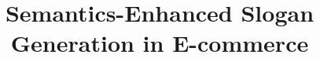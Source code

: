 \documentclass[sigconf]{acmart}
\theoremstyle{definition}
\begin{document}
\title{Semantics-Enhanced Slogan Generation in E-commerce}

%
%
%
%
%
%
%

\author{
}

\renewcommand{\shortauthors}{Trovato and Tobin, et al.}
\end{document}
